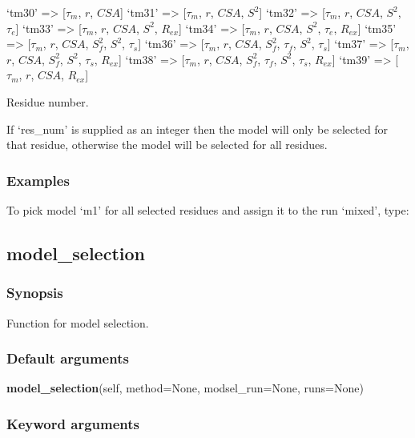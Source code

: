     `tm30'  => [$\tau_m$, $r$, $CSA$]
    `tm31'  => [$\tau_m$, $r$, $CSA$, $S^2$]
    `tm32'  => [$\tau_m$, $r$, $CSA$, $S^2$, $\tau_e$]
    `tm33'  => [$\tau_m$, $r$, $CSA$, $S^2$, $R_{ex}$]
    `tm34'  => [$\tau_m$, $r$, $CSA$, $S^2$, $\tau_e$, $R_{ex}$]
    `tm35'  => [$\tau_m$, $r$, $CSA$, $S^2_f$, $S^2$, $\tau_s$]
    `tm36'  => [$\tau_m$, $r$, $CSA$, $S^2_f$, $\tau_f$, $S^2$, $\tau_s$]
    `tm37'  => [$\tau_m$, $r$, $CSA$, $S^2_f$, $S^2$, $\tau_s$, $R_{ex}$]
    `tm38'  => [$\tau_m$, $r$, $CSA$, $S^2_f$, $\tau_f$, $S^2$, $\tau_s$, $R_{ex}$]
    `tm39'  => [$\tau_m$, $r$, $CSA$, $R_{ex}$]



Residue number.

If `res\_num' is supplied as an integer then the model will only be selected for that
residue, otherwise the model will be selected for all residues.



\subsubsection{Examples}

To pick model `m1' for all selected residues and assign it to the run `mixed', type:




\newpage

\subsection{model\_selection}


\subsubsection{Synopsis}

Function for model selection.

\subsubsection{Default arguments}

\textsf{\textbf{model\_selection}(self, method=None, modsel\_run=None, runs=None)}


\subsubsection{Keyword arguments}


